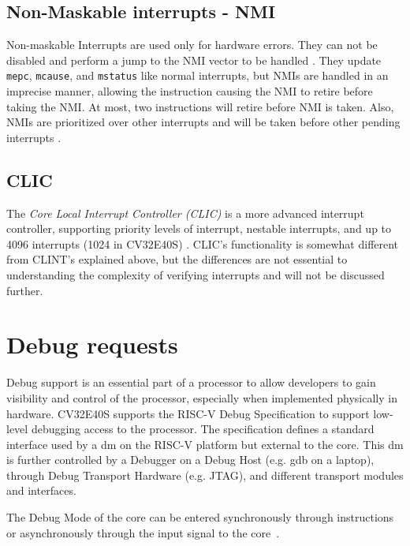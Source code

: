 \subsection{Non-Maskable interrupts - NMI}

Non-maskable Interrupts are used only for hardware errors. They can not be disabled and perform a jump to the NMI vector to be handled \cite{watermanRISCVInstructionSet2021}. They update \lstinline{mepc}, \lstinline{mcause}, and \lstinline{mstatus} like normal interrupts, but NMIs are handled in an imprecise manner, allowing the instruction causing the NMI to retire before taking the NMI. At most, two instructions will retire before NMI is taken. 
Also, NMIs are prioritized over other interrupts and will be taken before other pending interrupts \cite{openhwgroupExceptionsInterruptsCOREV2023}.

\subsection{CLIC}

The \textit{Core Local Interrupt Controller (CLIC)} is a more advanced interrupt controller, supporting priority levels of interrupt, nestable interrupts, and up to 4096 interrupts (1024 in CV32E40S) \cite{openhwgroupExceptionsInterruptsCOREV2023}. CLIC's functionality is somewhat different from CLINT's explained above, but the differences are not essential to understanding the complexity of verifying interrupts and will not be discussed further. 



\section{Debug requests}
\label{sec:bg_debug}

Debug support is an essential part of a processor to allow developers to gain visibility and control of the processor, especially when implemented physically in hardware. CV32E40S supports the RISC-V Debug Specification \cite{pauldonahueRISCVDebugSupport2023} to support low-level debugging access to the processor. The specification defines a standard interface used by a \acrfull{dm} on the RISC-V platform but external to the core. This \acrshort{dm} is further controlled by a Debugger on a Debug Host (e.g. gdb on a laptop), through Debug Transport Hardware (e.g. JTAG), and different transport modules and interfaces. 

The Debug Mode of the core can be entered synchronously through  instructions or asynchronously through the  input signal to the core~\cite{openhwgroupDebugTriggerCOREV2023}.

